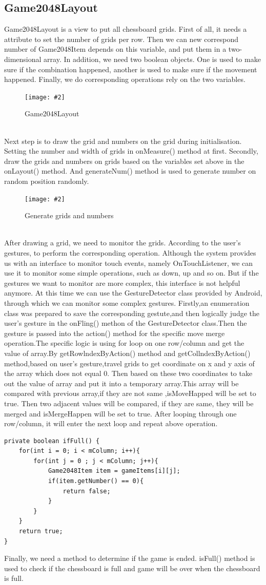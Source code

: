 \documentclass[10pt, a4paper]{article}
\newcommand{\figuremacro}[5]{
    \begin{figure}[#1]
        \centering
        \texttt{[image: \#2]}
        \caption[#3]{\textbf{#3}#4}
        \label{fig:#2}
    \end{figure}
}
\begin{document}
	\subsection{Game2048Layout}
	Game2048Layout is a view to put all chessboard grids. First of all, it needs a attribute to set the number of grids per row. Then we can new correspond number of Game2048Item depends on this variable, and put them in a two-dimensional array. In addition, we need two boolean objects. One is used to make sure if the combination happened, another is used to make sure if the movement happened. Finally, we do corresponding operations rely on the two variables.
	\figuremacro{h}{3.JPG}{}{Game2048Layout}{1.0}\\
	Next step is to draw the grid and numbers on the grid during initialisation. Setting the number and width of grids in onMeasure() method at first. Secondly, draw the grids and numbers on grids based on the variables set above in the onLayout() method. And generateNum() method is used to generate number on random position randomly.
	\figuremacro{h}{4.JPG}{}{Generate grids and numbers }{1.0}\\
   After drawing a grid, we need to monitor the grids. According to the user's gestures, to perform the corresponding operation. Although the system provides us with an interface to monitor touch events, namely OnTouchListener, we can use it to monitor some simple operations, such as down, up and so on. But if the gestures we want to monitor are more complex, this interface is not helpful anymore. At this time we can use the GestureDetector class provided by Android, through which we can monitor some complex gestures. Firstly,an enumeration class was prepared to save the corresponding gestute,and then logically judge the user's gesture in the onFling() methon of the GestureDetector class.Then the gesture is passed into the action() method for the specific move merge operation.The specific logic is using for loop on one row/column and get the value of array.By getRowlndexByAction() method and getCollndexByAction() method,based on user's gesture,travel grids to get coordinate on x and y axis of the array which does not equal 0. Then based on these two coordinates to take out the value of array and put it into a temporary array.This array will be compared with previous array,if they are not same ,isMoveHapped will be set to true. Then two adjacent values will be compared, if they are same, they will be merged and isMergeHappen will be set to true. After looping through one row/column, it will enter the next loop and repeat above operation.
  \begin{lstlisting}[Determination method]
  private boolean ifFull() {
    for(int i = 0; i < mColumn; i++){
        for(int j = 0 ; j < mColumn; j++){
            Game2048Item item = gameItems[i][j];
            if(item.getNumber() == 0){
                return false;
            }
        }
    }
    return true;
}
\end{lstlisting}
    Finally, we need a method to determine if the game is ended. isFull() method is used to check if the chessboard is full and game will be over when the chessboard is full.
\end{document}
